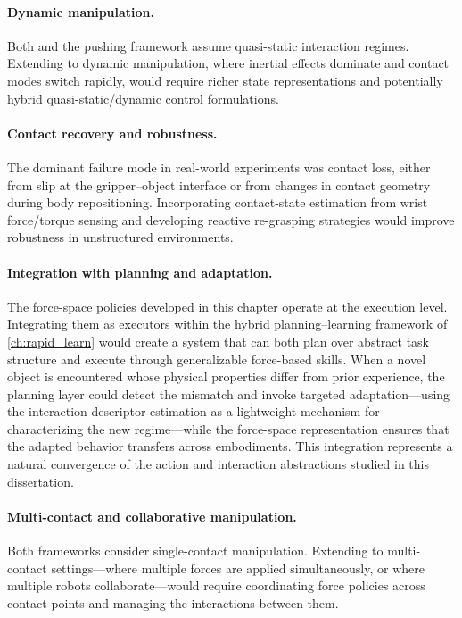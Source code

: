 \paragraph{Dynamic manipulation.} Both \FLEX{} and the pushing framework assume quasi-static interaction regimes. Extending to dynamic manipulation, where inertial effects dominate and contact modes switch rapidly, would require richer state representations and potentially hybrid quasi-static/dynamic control formulations.

\paragraph{Contact recovery and robustness.} The dominant failure mode in real-world experiments was contact loss, either from slip at the gripper--object interface or from changes in contact geometry during body repositioning. Incorporating contact-state estimation from wrist force/torque sensing and developing reactive re-grasping strategies would improve robustness in unstructured environments.

\paragraph{Integration with planning and adaptation.} The force-space policies developed in this chapter operate at the execution level. Integrating them as executors within the hybrid planning--learning framework of \cref{ch:rapid_learn} would create a system that can both plan over abstract task structure and execute through generalizable force-based skills. When a novel object is encountered whose physical properties differ from prior experience, the planning layer could detect the mismatch and invoke targeted adaptation---using the interaction descriptor estimation as a lightweight mechanism for characterizing the new regime---while the force-space representation ensures that the adapted behavior transfers across embodiments. This integration represents a natural convergence of the action and interaction abstractions studied in this dissertation.

\paragraph{Multi-contact and collaborative manipulation.} Both frameworks consider single-contact manipulation. Extending to multi-contact settings---where multiple forces are applied simultaneously, or where multiple robots collaborate---would require coordinating force policies across contact points and managing the interactions between them.

